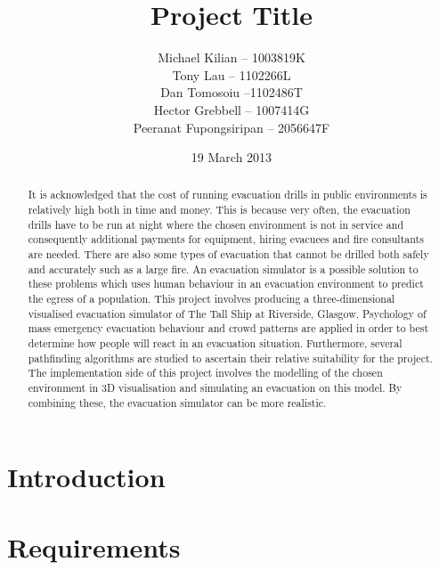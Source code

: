 \documentclass{l3proj}
\begin{document}
\title{Project Title}
\author{Michael Kilian -- 1003819K \\
        Tony Lau -- 1102266L\\
        Dan Tomosoiu --1102486T \\
        Hector Grebbell -- 1007414G \\
        Peeranat Fupongsiripan -- 2056647F}
\date{19 March 2013}
\maketitle

\begin{abstract}
It is acknowledged that the cost of 
running evacuation drills in public environments is relatively high both in time and money. This is because very often, the 
evacuation drills have to be run at night where the chosen environment is not in service and consequently additional payments for 
equipment, hiring evacuees and fire consultants are needed.
There are also some types of evacuation that cannot be drilled both safely and accurately such as a large fire.
An evacuation simulator is a possible solution to these problems which uses human behaviour in an evacuation environment 
to predict the egress of a population. This project involves producing a three-dimensional visualised 
evacuation simulator of The Tall Ship at Riverside, Glasgow. Psychology of mass emergency evacuation behaviour and crowd patterns are applied in 
order to best determine how people will react in an evacuation situation. Furthermore, several pathfinding algorithms 
are studied to ascertain their relative suitability for the project.
The implementation side of this project 
involves the modelling of the chosen environment in 3D visualisation and simulating an evacuation on this model.
By combining these, the evacuation simulator can be more realistic.
\end{abstract}

\educationalconsent
\tableofcontents
\chapter{Introduction}
\label{introduction}





\chapter{Requirements}
\label{requirements}

\end{document}
